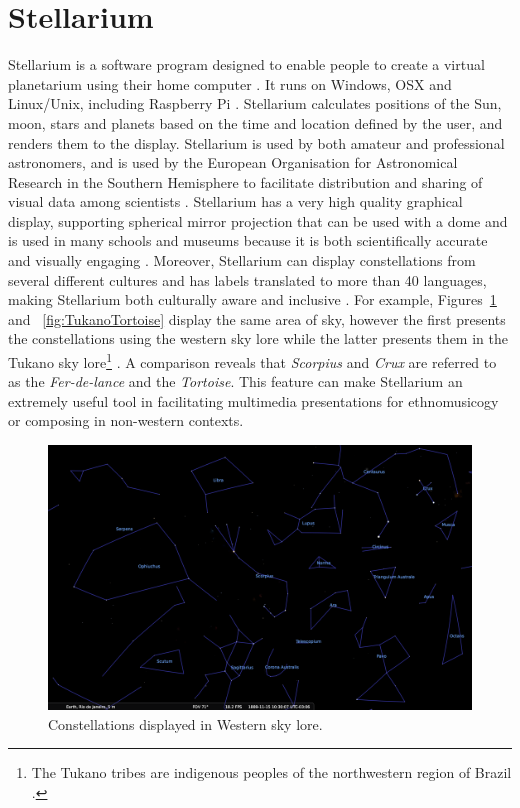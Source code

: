 \documentclass[10pt,a4paper,extrafontsizes]{memoir}
\begin{document}
\section{Stellarium}
Stellarium is a software program designed to enable people to create a virtual planetarium using their home computer \cite{zottistellarium}. It runs on Windows, OSX and Linux/Unix, including Raspberry Pi \cite[p.~6]{zottistellarium}.  Stellarium calculates positions of the Sun, moon, stars and planets based on the time and location defined by the user, and renders them to the display.  Stellarium is used by both amateur and professional astronomers, and is used by the  European Organisation for Astronomical Research in the Southern Hemisphere to facilitate distribution and sharing of visual data among scientists \cite{berglund2008using}. Stellarium has a very high quality graphical display, supporting spherical mirror projection that can be used with a dome \cite{mc2009touring} and is used in many schools and museums because it is both scientifically accurate and visually engaging \cite{berglund2008using}.  Moreover, Stellarium can display constellations from several different cultures and has labels translated to more than 40 languages, making Stellarium both culturally aware and inclusive \cite{berglund2008using}. 
For example,  Figures~\ref{fig:WesternCrux} and ~\ref{fig:TukanoTortoise} display the same area of sky, however the first presents the constellations using the western sky lore while the latter presents them in the Tukano sky lore\footnote{The Tukano tribes are indigenous peoples of the northwestern region of Brazil \cite{KnoblochFrancis1976TTIA}.} \cite{reichel1976cosmology}. A comparison reveals that \textit{Scorpius} and \textit{Crux} are referred to as the \textit{Fer-de-lance} and the \textit{Tortoise}. This feature can make Stellarium an extremely useful tool in facilitating multimedia presentations for ethnomusicogy or composing in non-western contexts.

\begin{figure}[htbp]
	\centering
	\includegraphics[width=1\columnwidth]{WesternCrux}
	\caption{Constellations displayed in Western sky lore.}
	\label{fig:WesternCrux}
\end{figure}
\end{document}
